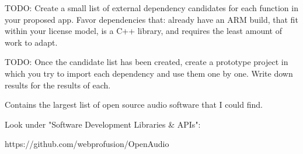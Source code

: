 TODO: Create a small list of external dependency candidates for each function in your proposed app. Favor dependencies that: already have an ARM build, that fit within your license model, is a C++ library, and requires the least amount of work to adapt.

TODO: Once the candidate list has been created, create a prototype project in which you try to import each dependency and use them one by one. Write down results for the results of each.



Contains the largest list of open source audio software that I could find. 

Look under "Software Development Libraries \& APIs":

https://github.com/webprofusion/OpenAudio

